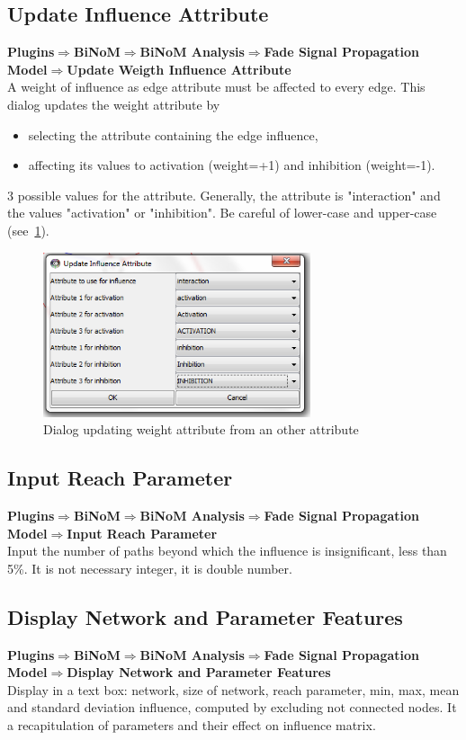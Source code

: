 \subsection{Update Influence Attribute}
\textbf{Plugins$\Rightarrow$BiNoM$\Rightarrow$BiNoM Analysis$\Rightarrow$Fade Signal Propagation Model$\Rightarrow$Update Weigth Influence Attribute}\\
A weight of influence as edge attribute must be affected to every edge. This dialog updates the weight attribute by 
\begin{itemize}
\item selecting the attribute containing the edge influence,
\item affecting its values to activation (weight=+1) and inhibition (weight=-1).
\end{itemize}
3 possible values for the attribute. Generally, the attribute is "interaction" and the values "activation" or "inhibition". Be careful of lower-case and upper-case (see~\ref{Weight_Attribute_Dialog}).

\begin{figure}
\centering
\includegraphics[width=0.7\textwidth]{graphics/Weight_Attribute_Dialog}
\caption{Dialog updating weight attribute from an other attribute}
\label{Weight_Attribute_Dialog}
\end{figure}

\subsection{Input Reach Parameter}
\textbf{Plugins$\Rightarrow$BiNoM$\Rightarrow$BiNoM Analysis$\Rightarrow$Fade Signal Propagation Model$\Rightarrow$Input Reach Parameter}\\
Input the number of paths beyond which the influence is insignificant, less than 5\%. It is not necessary integer, it is double number.

\subsection{Display Network and Parameter Features}
\textbf{Plugins$\Rightarrow$BiNoM$\Rightarrow$BiNoM Analysis$\Rightarrow$Fade Signal Propagation Model$\Rightarrow$Display Network and Parameter Features}\\
Display in a text box: network, size of network, reach parameter, min, max, mean and standard deviation influence, computed by excluding not connected nodes. It a recapitulation of parameters and their effect on influence matrix.

